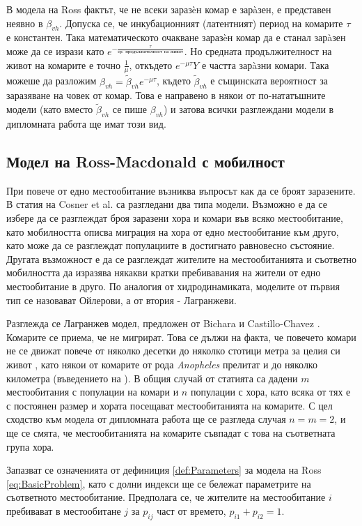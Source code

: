 В модела на Ross фактът, че не всеки заразèн комар е зарàзен, е представен неявно в $\beta_{vh}$.
Допуска се, че инкубационният (латентният) период на комарите $\tau$ е константен.
Така математическото очакване заразèн комар да е станал зарàзен може да се изрази като $e^{-\frac{\tau}{\text{ср. продължителност на живот}}}$.
Но средната продължителност на живот на комарите е точно $\frac{1}{\mu}$, откъдето $e^{-\mu\tau}Y$ е частта зарàзни комари.
Така можеше да разложим $\beta_{vh} = \tilde{\beta}_{vh} e^{-\mu\tau}$, където $\tilde{\beta}_{vh}$ е същинската вероятност за заразяване на човек от комар.
Това е направено в някои от по-нататъшните модели \cite{Smith2012} (като вместо $\tilde{\beta}_{vh}$ се пише $\beta_{vh}$) и затова всички разглеждани модели в дипломната работа ще имат този вид.

\subsection{Модел на Ross-Macdonald с мобилност}
При повече от едно местообитание възниква въпросът как да се броят заразените. В статия на Cosner et al. \cite{Cosner2009} са разгледани два типа модели.
Възможно е да се избере да се разглеждат броя заразени хора и комари във всяко местообитание, като мобилността описва миграция на хора от едно местообитание към друго, като може да се разглеждат популациите в достигнато равновесно състояние.
Другата възможност е да се разглеждат жителите на местообитанията и съответно мобилността да изразява някакви кратки пребивавания на жители от едно местообитание в друго.
По аналогия от хидродинамиката, моделите от първия тип се назовават Ойлерови, а от втория - Лагранжеви.

Разглежда се Лагранжев модел, предложен от Bichara и Castillo-Chavez \cite{Bichara2016}.
Комарите се приема, че не мигрират.
Това се дължи на факта, че повечето комари не се движат повече от няколко десетки до няколко стотици метра за целия си живот \cite{Elbers2015}, като някои от комарите от рода \textit{Anopheles} прелитат и до няколко километра (въведението на \cite{Bichara2016}).
В общия случай от статията са дадени $m$ местообитания с популации на комари и $n$ популации с хора, като всяка от тях е с постоянен размер и хората посещават местообитанията на комарите.
С цел сходство към модела от дипломната работа ще се разгледа случая $n=m=2$, и ще се смята, че местообитанията на комарите съвпадат с това на съответната група хора.

Запазват се означенията от дефиниция \ref{def:Parameters} за модела на Ross \eqref{eq:BasicProblem}, като с долни индекси ще се бележат параметрите на съответното местообитание.
Предполага се, че жителите на местообитание $i$ пребивават в местообитане $j$ за $p_{ij}$ част от времето, $p_{i1} + p_{i2} = 1$.

